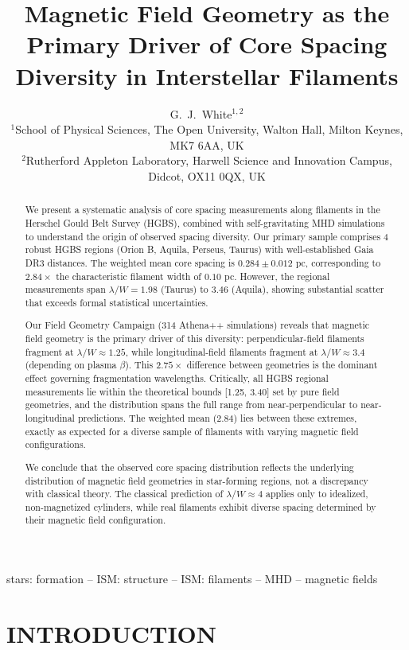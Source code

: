 \documentclass[twoside,twocolumn]{mnras}
\title{Magnetic Field Geometry as the Primary Driver of Core Spacing Diversity in Interstellar Filaments}
\author[G.~J.~White]{G.~J.~White$^{1,2}$\\
$^{1}$School of Physical Sciences, The Open University, Walton Hall, Milton Keynes, MK7 6AA, UK\\
$^{2}$Rutherford Appleton Laboratory, Harwell Science and Innovation Campus, Didcot, OX11 0QX, UK}
\begin{document}
\maketitle

\begin{abstract}
We present a systematic analysis of core spacing measurements along filaments in the Herschel Gould Belt Survey (HGBS), combined with self-gravitating MHD simulations to understand the origin of observed spacing diversity. Our primary sample comprises 4 robust HGBS regions (Orion B, Aquila, Perseus, Taurus) with well-established Gaia DR3 distances. The weighted mean core spacing is $0.284 \pm 0.012$ pc, corresponding to $2.84\times$ the characteristic filament width of $0.10$ pc. However, the regional measurements span $\lambda/W = 1.98$ (Taurus) to $3.46$ (Aquila), showing substantial scatter that exceeds formal statistical uncertainties.

Our Field Geometry Campaign (314 Athena++ simulations) reveals that magnetic field geometry is the primary driver of this diversity: perpendicular-field filaments fragment at $\lambda/W \approx 1.25$, while longitudinal-field filaments fragment at $\lambda/W \approx 3.4$ (depending on plasma $\beta$). This $2.75\times$ difference between geometries is the dominant effect governing fragmentation wavelengths. Critically, all HGBS regional measurements lie within the theoretical bounds [1.25, 3.40] set by pure field geometries, and the distribution spans the full range from near-perpendicular to near-longitudinal predictions. The weighted mean (2.84) lies between these extremes, exactly as expected for a diverse sample of filaments with varying magnetic field configurations.

We conclude that the observed core spacing distribution reflects the underlying distribution of magnetic field geometries in star-forming regions, not a discrepancy with classical theory. The classical prediction of $\lambda/W \approx 4$ applies only to idealized, non-magnetized cylinders, while real filaments exhibit diverse spacing determined by their magnetic field configuration.
\end{abstract}

\begin{keywords}
stars: formation -- ISM: structure -- ISM: filaments -- MHD -- magnetic fields
\end{keywords}

\section{INTRODUCTION}
\end{document}
